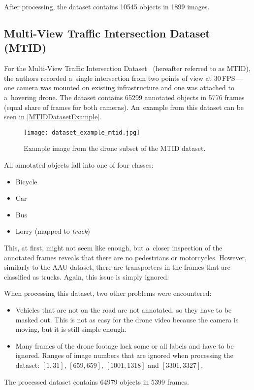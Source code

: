 After processing, the dataset contains \num{10545} objects in \num{1899} images.


\subsection{Multi-View Traffic Intersection Dataset (MTID)}

For the Multi-View Traffic Intersection Dataset~\cite{Jensen2020} (hereafter referred to as MTID), the
authors recorded a~single intersection from two points of view at 30\,FPS\,---\,one
camera was mounted on existing infrastructure and one was attached to a~hovering
drone. The dataset contains \num{65299} annotated objects in \num{5776} frames
(equal share of frames for both cameras). An~example from this dataset can be
seen in \autoref{MTIDDatasetExample}.

\begin{figure}[t]
    \centering
    \texttt{[image: dataset\_example\_mtid.jpg]}
    \captionsetup{width=0.8\textwidth}
    \caption{Example image from the drone subset of the MTID dataset.}
    \label{MTIDDatasetExample}
\end{figure}

All annotated objects fall into one of four classes:
\begin{itemize}
    \item Bicycle
    \item Car
    \item Bus
    \item Lorry (mapped to \textit{truck})
\end{itemize}
This, at first, might not seem like enough, but a~closer inspection of the
annotated frames reveals that there are no pedestrians or motorcycles. However,
similarly to the AAU dataset, there are transporters in the frames
that are classified as trucks. Again, this issue is simply ignored.

When processing this dataset, two other problems were encountered:
\begin{itemize}
    \item Vehicles that are not on the road are not annotated, so they have to
    be masked out. This is not as easy for the drone video because the camera is
    moving, but it is still simple enough.
    \item Many frames of the drone footage lack some or all labels and have to
    be ignored. Ranges of image numbers that are ignored when processing the
    dataset: $[1,31]$, $[659,659]$, $[1001,1318]$ and $[3301,3327]$.
\end{itemize}
The processed dataset contains \num{64979} objects in \num{5399} frames.


